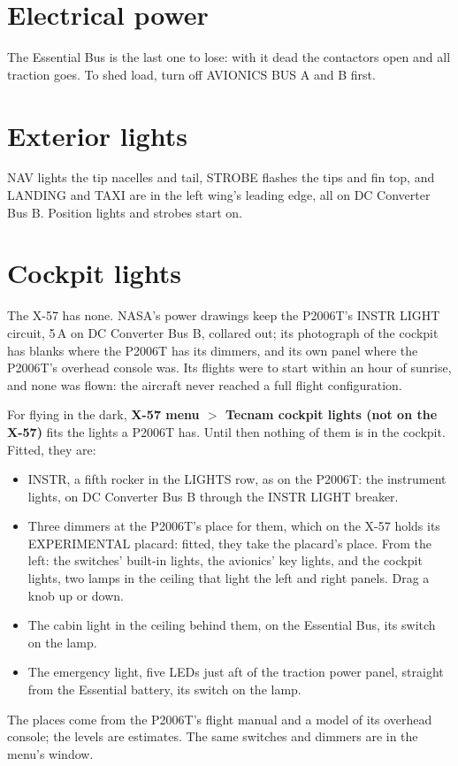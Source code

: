 \documentclass[11pt,a4paper,oneside]{book}
\newcommand{\Tab}[1]{\begingroup\small\endgroup\par\medskip}
\newcommand{\ann}[1]{\textsf{\small #1}}
\begin{document}
\enlargethispage{1\baselineskip}
\section{Electrical power}
\Tab{power}
The Essential Bus is the last one to lose: with it dead the contactors open and all traction goes. To shed load, turn off \ann{AVIONICS BUS A} and \ann{B} first.


\section{Exterior lights}
\ann{NAV} lights the tip nacelles and tail, \ann{STROBE} flashes the tips and fin top, and \ann{LANDING} and \ann{TAXI} are in the left wing's leading edge, all on DC Converter Bus B. Position lights and strobes start on.

\section{Cockpit lights}\label{sec:cockpitlights}
The X-57 has none. NASA's power drawings keep the P2006T's \ann{INSTR LIGHT} circuit, 5\,A on DC Converter Bus B, collared out; its photograph of the cockpit has blanks where the P2006T has its dimmers, and its own panel where the P2006T's overhead console was. Its flights were to start within an hour of sunrise, and none was flown: the aircraft never reached a full flight configuration.

For flying in the dark, \textbf{X-57 menu $>$ Tecnam cockpit lights (not on the X-57)} fits the lights a P2006T has. Until then nothing of them is in the cockpit. Fitted, they are:
\begin{itemize}
\item \ann{INSTR}, a fifth rocker in the \ann{LIGHTS} row, as on the P2006T: the instrument lights, on DC Converter Bus B through the \ann{INSTR LIGHT} breaker.
\item Three dimmers at the P2006T's place for them, which on the X-57 holds its \ann{EXPERIMENTAL} placard: fitted, they take the placard's place. From the left: the switches' built-in lights, the avionics' key lights, and the cockpit lights, two lamps in the ceiling that light the left and right panels. Drag a knob up or down.
\item The cabin light in the ceiling behind them, on the Essential Bus, its switch on the lamp.
\item The emergency light, five LEDs just aft of the traction power panel, straight from the Essential battery, its switch on the lamp.
\end{itemize}
The places come from the P2006T's flight manual and a model of its overhead console; the levels are estimates. The same switches and dimmers are in the menu's window.
\end{document}
